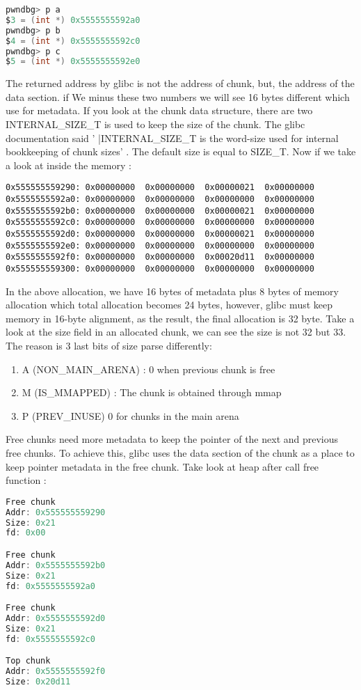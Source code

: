\documentclass{masterthesis}
\newcommand*\sizet{SIZE\_T}
\newcommand*\libc{glibc}
\begin{document}
\begin{lstlisting}[language=c]
pwndbg> p a
$3 = (int *) 0x5555555592a0
pwndbg> p b
$4 = (int *) 0x5555555592c0
pwndbg> p c
$5 = (int *) 0x5555555592e0
\end{lstlisting}
The returned address by \libc{} is not the address of chunk, but, the address of the data section. if We minus these two numbers we will see 16 bytes different which use for metadata. If you look at the chunk data structure, there are two INTERNAL\_SIZE\_T is used to keep the size of the chunk. The \libc{} documentation said ' |INTERNAL\_SIZE\_T is the word-size used for internal bookkeeping of chunk sizes' . The default size is equal to \sizet{}. Now if we take a look at inside the memory : 
\begin{lstlisting}
0x555555559290:	0x00000000	0x00000000	0x00000021	0x00000000
0x5555555592a0:	0x00000000	0x00000000	0x00000000	0x00000000
0x5555555592b0:	0x00000000	0x00000000	0x00000021	0x00000000
0x5555555592c0:	0x00000000	0x00000000	0x00000000	0x00000000
0x5555555592d0:	0x00000000	0x00000000	0x00000021	0x00000000
0x5555555592e0:	0x00000000	0x00000000	0x00000000	0x00000000
0x5555555592f0:	0x00000000	0x00000000	0x00020d11	0x00000000
0x555555559300:	0x00000000	0x00000000	0x00000000	0x00000000
\end{lstlisting}
In the above allocation, we have 16 bytes of metadata plus 8 bytes of memory allocation which total allocation becomes 24 bytes, however, \libc{} must keep memory in 16-byte alignment, as the result, the final allocation is 32 byte. Take a look at the size field in an allocated chunk, we can see the size is not 32 but 33. The reason is 3 last bits of size parse differently:
\begin{enumerate}
	\item A (NON\_MAIN\_ARENA) : 0 when previous chunk is free
	\item M (IS\_MMAPPED) : The chunk is obtained through mmap
	\item P (PREV\_INUSE) 0 for chunks in the main arena
\end{enumerate}
Free chunks need more metadata to keep the pointer of the next and previous free chunks. To achieve this, \libc{} uses the data section of the chunk as a place to keep pointer metadata in the free chunk. Take look at heap after call free function :
\begin{lstlisting}[language=c]
Free chunk 
Addr: 0x555555559290
Size: 0x21
fd: 0x00

Free chunk
Addr: 0x5555555592b0
Size: 0x21
fd: 0x5555555592a0

Free chunk 
Addr: 0x5555555592d0
Size: 0x21
fd: 0x5555555592c0

Top chunk
Addr: 0x5555555592f0
Size: 0x20d11
\end{lstlisting}
\end{document}
